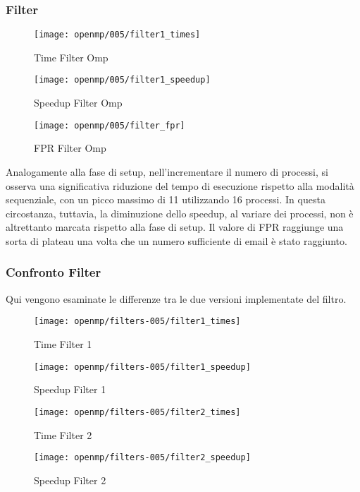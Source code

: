 \subsubsection{Filter}\label{subsubsec:fpr-005-filter}
\begin{figure}[H]
    \centering
    \texttt{[image: openmp/005/filter1\_times]}
        \caption{Time Filter Omp}\label{fig:005-filter_time_omp}
    \endminipage\hfill
    \texttt{[image: openmp/005/filter1\_speedup]}
        \caption{Speedup Filter Omp}\label{fig:005-filter_speedup_omp}
    \endminipage\hfill
\end{figure}
\begin{figure}[H]
    \centering
    \texttt{[image: openmp/005/filter\_fpr]}
        \caption{FPR Filter Omp}\label{fig:005-filter_fpr_omp}
    \endminipage\hfill
\end{figure}

Analogamente alla fase di setup, nell'incrementare il numero di processi, si osserva una significativa riduzione del
tempo di esecuzione rispetto alla modalità sequenziale, con un picco massimo di 11 utilizzando 16 processi.
In questa circostanza, tuttavia, la diminuzione dello speedup, al variare dei processi, non è altrettanto marcata
rispetto alla fase di setup.
Il valore di FPR raggiunge una sorta di plateau una volta che un numero sufficiente di email è stato raggiunto.

\subsubsection{Confronto Filter}\label{subsubsec:confronto-filter}
Qui vengono esaminate le differenze tra le due versioni implementate del filtro.

\begin{figure}[H]
    \centering
    \texttt{[image: openmp/filters-005/filter1\_times]}
        \caption{Time Filter 1}\label{fig:005-filter1_time_omp}
    \endminipage\hfill
    \texttt{[image: openmp/filters-005/filter1\_speedup]}
        \caption{Speedup Filter 1}\label{fig:005-filter1_speedup_omp}
    \endminipage\hfill
\end{figure}
\begin{figure}[H]
    \centering
    \texttt{[image: openmp/filters-005/filter2\_times]}
        \caption{Time Filter 2}\label{fig:005-filter2_time_omp}
    \endminipage\hfill
    \texttt{[image: openmp/filters-005/filter2\_speedup]}
        \caption{Speedup Filter 2}\label{fig:005-filter2_speedup_omp}
    \endminipage\hfill
\end{figure}

